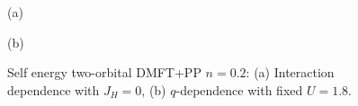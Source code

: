 \begin{figure}[h!]
\begin{minipage}[h]{0.5\linewidth}
 (a) \\
\end{minipage}
\hfill
\begin{minipage}[h]{0.5\linewidth}
 (b) \\
\end{minipage}
\caption{Self energy two-orbital DMFT+PP $n=0.2$: (a) Interaction dependence with $J_{H}=0$, (b) $q$-dependence with fixed $U=1.8$.}
\label{fig:2_orb_Sigma_pp_mu_eq}
\end{figure}


